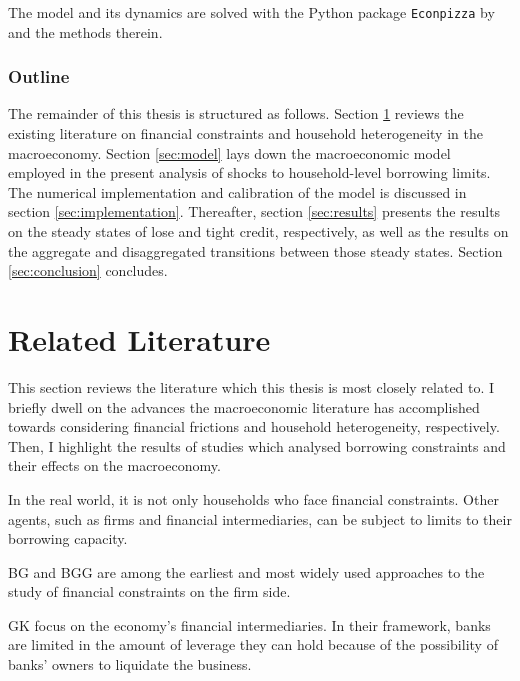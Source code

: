 \documentclass[12pt]{article} %
\numberwithin{equation}{section} %
\begin{document}

The model and its dynamics are solved with the Python package \texttt{Econpizza} by \textcite{boehl2023econpizza} and the methods therein.

\subsubsection*{Outline}
\label{sec:outline}
The remainder of this thesis is structured as follows. Section \ref{sec:literature} reviews the existing literature on financial constraints and household heterogeneity in the macroeconomy. Section \ref{sec:model} lays down the macroeconomic model employed in the present analysis of shocks to household-level borrowing limits. The numerical implementation and calibration of the model is discussed in section \ref{sec:implementation}. Thereafter, section \ref{sec:results} presents the results on the steady states of lose and tight credit, respectively, as well as the results on the aggregate and disaggregated transitions between those steady states. Section \ref{sec:conclusion} concludes.

\section{Related Literature}
\label{sec:literature}

This section reviews the literature which this thesis is most closely related to. I briefly dwell on the advances the macroeconomic literature has accomplished towards considering financial frictions and household heterogeneity, respectively. Then, I highlight the results of studies which analysed borrowing constraints and their effects on the macroeconomy.

In the real world, it is not only households who face financial constraints. Other agents, such as firms and financial intermediaries, can be subject to limits to their borrowing capacity.

BG and BGG are among the earliest and most widely used approaches to the study of financial constraints on the firm side.

GK focus on the economy's financial intermediaries. In their framework, banks are limited in the amount of leverage they can hold because of the possibility of banks' owners to liquidate the business.
\end{document}
